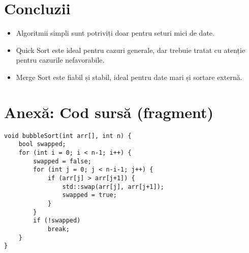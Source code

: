 \documentclass[12pt]{article}
\begin{document}
\section{Concluzii}

\begin{itemize}
    \item Algoritmii simpli sunt potriviți doar pentru seturi mici de date.
    \item Quick Sort este ideal pentru cazuri generale, dar trebuie tratat cu atenție pentru cazurile nefavorabile.
    \item Merge Sort este fiabil și stabil, ideal pentru date mari și sortare externă.
\end{itemize}

\section*{Anexă: Cod sursă (fragment)}

\begin{verbatim}
void bubbleSort(int arr[], int n) {
    bool swapped;
    for (int i = 0; i < n-1; i++) {
        swapped = false;
        for (int j = 0; j < n-i-1; j++) {
            if (arr[j] > arr[j+1]) {
                std::swap(arr[j], arr[j+1]);
                swapped = true;
            }
        }
        if (!swapped)
            break;
    }
}
\end{verbatim}
\end{document}
